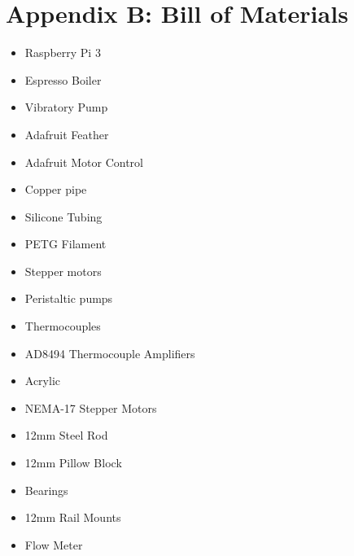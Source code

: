 \documentclass[conference]{IEEEtran}
\begin{document}
\section{Appendix B: Bill of Materials}
\begin{itemize}
\item Raspberry Pi 3
\item Espresso Boiler 
\item Vibratory Pump
\item Adafruit Feather
\item Adafruit Motor Control
\item Copper pipe
\item Silicone Tubing
\item PETG Filament
\item Stepper motors
\item Peristaltic pumps
\item Thermocouples
\item AD8494 Thermocouple Amplifiers
\item Acrylic
\item NEMA-17 Stepper Motors
\item 12mm Steel Rod
\item 12mm Pillow Block
\item Bearings
\item 12mm Rail Mounts
\item Flow Meter
\end{itemize}

{}

\end{document}

